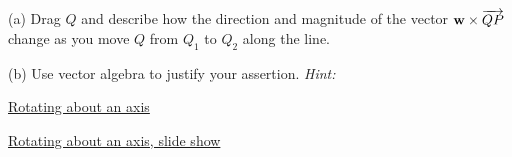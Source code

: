 \documentclass{ximera}
\begin{document}
\begin{question}  \label{Qdstjigvgf:Cross}
(a) Drag $Q$ and describe how the direction and magnitude of the vector ${\bf w}\times {\overrightarrow{QP}}$ change as you move $Q$ from $Q_1$ to $Q_2$ along the line.

(b) Use vector algebra to justify your assertion.  {\it Hint:}

 
\begin{onlineOnly}
    \begin{center}
\end{center}
\end{onlineOnly}



\end{question}



\begin{exploration}



\href{https://www.desmos.com/3d/31f1fd3ffd}{Rotating about an axis}


\href{https://www.desmos.com/3d/a82ef238da}{Rotating about an axis, slide show}


\end{exploration}
\end{document}
